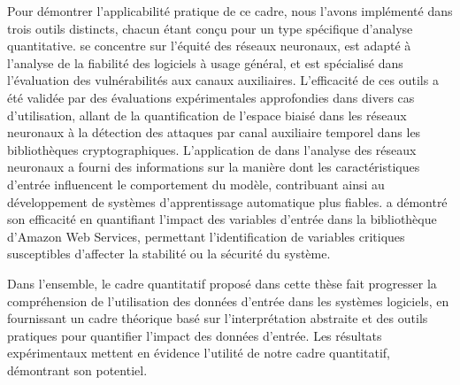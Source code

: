 {Pour démontrer l'applicabilité pratique de ce cadre, nous l'avons implémenté dans trois outils distincts, chacun étant conçu pour un type spécifique d'analyse quantitative. \libra{} se concentre sur l'équité des réseaux neuronaux, \impatto{} est adapté à l'analyse de la fiabilité des logiciels à usage général, et \timesec{} est spécialisé dans l'évaluation des vulnérabilités aux canaux auxiliaires. L'efficacité de ces outils a été validée par des évaluations expérimentales approfondies dans divers cas d'utilisation, allant de la quantification de l'espace biaisé dans les réseaux neuronaux à la détection des attaques par canal auxiliaire temporel dans les bibliothèques cryptographiques. L'application de \libra{} dans l'analyse des réseaux neuronaux a fourni des informations sur la manière dont les caractéristiques d'entrée influencent le comportement du modèle, contribuant ainsi au développement de systèmes d'apprentissage automatique plus fiables. \timesec{} a démontré son efficacité en quantifiant l'impact des variables d'entrée dans la bibliothèque \bignum{} d'Amazon Web Services, permettant l'identification de variables critiques susceptibles d'affecter la stabilité ou la sécurité du système.

Dans l'ensemble, le cadre quantitatif proposé dans cette thèse fait progresser la compréhension de l'utilisation des données d'entrée dans les systèmes logiciels, en fournissant un cadre théorique basé sur l'interprétation abstraite et des outils pratiques pour quantifier l'impact des données d'entrée. Les résultats expérimentaux mettent en évidence l'utilité de notre cadre quantitatif, démontrant son potentiel.
}
